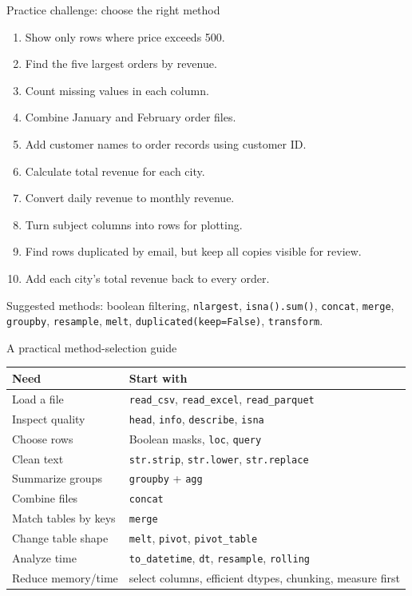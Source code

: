 \documentclass[aspectratio=169,10pt]{beamer}
\begin{document}
\begin{frame}[fragile]{Practice challenge: choose the right method}
\begin{enumerate}
\item Show only rows where price exceeds 500.
\item Find the five largest orders by revenue.
\item Count missing values in each column.
\item Combine January and February order files.
\item Add customer names to order records using customer ID.
\item Calculate total revenue for each city.
\item Convert daily revenue to monthly revenue.
\item Turn subject columns into rows for plotting.
\item Find rows duplicated by email, but keep all copies visible for review.
\item Add each city's total revenue back to every order.
\end{enumerate}
\small Suggested methods: boolean filtering, \texttt{nlargest}, \texttt{isna().sum()}, \texttt{concat}, \texttt{merge}, \texttt{groupby}, \texttt{resample}, \texttt{melt}, \texttt{duplicated(keep=False)}, \texttt{transform}.
\end{frame}

\begin{frame}[fragile]{A practical method-selection guide}
\begin{tabular}{p{}p{}}
\toprule
\textbf{Need} & \textbf{Start with}\\
\midrule
Load a file & \texttt{read\_csv}, \texttt{read\_excel}, \texttt{read\_parquet}\\
Inspect quality & \texttt{head}, \texttt{info}, \texttt{describe}, \texttt{isna}\\
Choose rows & Boolean masks, \texttt{loc}, \texttt{query}\\
Clean text & \texttt{str.strip}, \texttt{str.lower}, \texttt{str.replace}\\
Summarize groups & \texttt{groupby} + \texttt{agg}\\
Combine files & \texttt{concat}\\
Match tables by keys & \texttt{merge}\\
Change table shape & \texttt{melt}, \texttt{pivot}, \texttt{pivot\_table}\\
Analyze time & \texttt{to\_datetime}, \texttt{dt}, \texttt{resample}, \texttt{rolling}\\
Reduce memory/time & select columns, efficient dtypes, chunking, measure first\\
\bottomrule
\end{tabular}
\end{frame}
\end{document}
